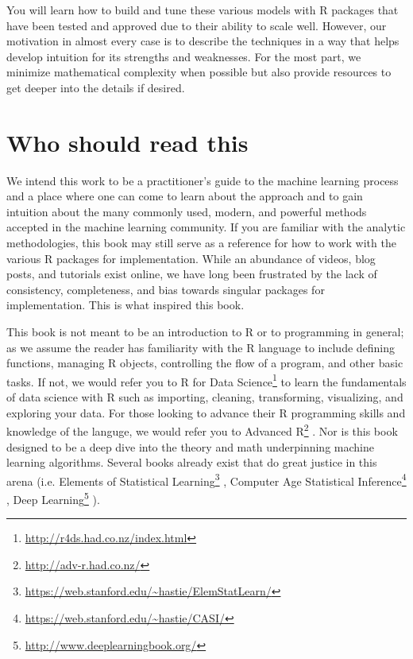 \documentclass[]{krantz}
\renewcommand{\href}[2]{#2\footnote{\url{#1}}}
\begin{document}
You will learn how to build and tune these various models with R packages that have been tested and approved due to their ability to scale well. However, our motivation in almost every case is to describe the techniques in a way that helps develop intuition for its strengths and weaknesses. For the most part, we minimize mathematical complexity when possible but also provide resources to get deeper into the details if desired.

\hypertarget{who-should-read-this}{%
\section*{Who should read this}\label{who-should-read-this}}


We intend this work to be a practitioner's guide to the machine learning process and a place where one can come to learn about the approach and to gain intuition about the many commonly used, modern, and powerful methods accepted in the machine learning community. If you are familiar with the analytic methodologies, this book may still serve as a reference for how to work with the various R packages for implementation. While an abundance of videos, blog posts, and tutorials exist online, we have long been frustrated by the lack of consistency, completeness, and bias towards singular packages for implementation. This is what inspired this book.

This book is not meant to be an introduction to R or to programming in general; as we assume the reader has familiarity with the R language to include defining functions, managing R objects, controlling the flow of a program, and other basic tasks. If not, we would refer you to \href{http://r4ds.had.co.nz/index.html}{R for Data Science} \citep{wickham2016r} to learn the fundamentals of data science with R such as importing, cleaning, transforming, visualizing, and exploring your data. For those looking to advance their R programming skills and knowledge of the languge, we would refer you to \href{http://adv-r.had.co.nz/}{Advanced R} \citep{wickham2014advanced}. Nor is this book designed to be a deep dive into the theory and math underpinning machine learning algorithms. Several books already exist that do great justice in this arena (i.e. \href{https://web.stanford.edu/~hastie/ElemStatLearn/}{Elements of Statistical Learning} \citep{esl}, \href{https://web.stanford.edu/~hastie/CASI/}{Computer Age Statistical Inference} \citep{efron2016computer}, \href{http://www.deeplearningbook.org/}{Deep Learning} \citep{goodfellow2016deep}).
\end{document}
